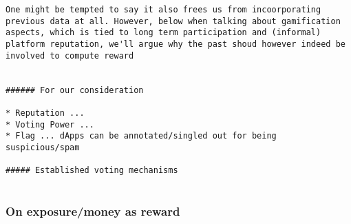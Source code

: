 {{\begin{verbatim}
One might be tempted to say it also frees us from incoorporating previous data at all. However, below when talking about gamification aspects, which is tied to long term participation and (informal) platform reputation, we'll argue why the past shoud however indeed be involved to compute reward


###### For our consideration

* Reputation ...
* Voting Power ...
* Flag ... dApps can be annotated/singled out for being suspicious/spam 

##### Established voting mechanisms


\end{verbatim}
}}%




\subsubsection{On exposure/money as reward}

{\color{blue}{
\begin{verbatim}


What does exposure mean?
	* a spot in a list (as opposed to relative quantitative gain, as in "Proportional representation")

Interested in all dApps => We want to use ranking

Positive votes (we vote who we want, not who we don't want). The ranking implicitly provites a mechanism to establish who's at the bottom of the food chain (see flagging) 

#### For the users
* Rewards
* Reputation?


\end{verbatim}
}}%





